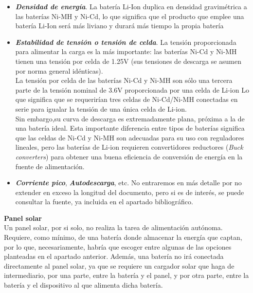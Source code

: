 \documentclass[12pt]{article}
\begin{document}
	\begin{itemize}
		\item \textit{\textbf{Densidad de energía}}. La batería Li-Ion duplica en densidad gravimétrica a las baterías Ni-MH y Ni-Cd, lo que significa que el producto que emplee una batería Li-Ion será más liviano y durará más tiempo la propia batería
		
		\item \textit{\textbf{Estabilidad de tensión o tensión de celda}}. 	La tensión proporcionada para alimentar la carga es la más importante: las baterías Ni-Cd y Ni-MH tienen una tensión por celda de 1.25V (sus tensiones de descarga se asumen por norma general idénticas). \\
		La tensión por celda de las baterías Ni-Cd y Ni-MH son sólo una tercera parte de la tensión nominal de 3.6V proporcionada por una celda de Li-ion Lo que significa que se requerirían tres celdas de Ni-Cd/Ni-MH conectadas en serie para igualar la tensión de una única celda de Li-ion.\\
		Sin embargo,su curva de descarga es extremadamente plana, próxima a la de una batería ideal. Esta importante diferencia entre tipos de baterías significa que las celdas de Ni-Cd y Ni-MH son adecuadas para su uso con reguladores lineales, pero las baterías de Li-ion requieren convertidores reductores (\textit{Buck converters}) para obtener una buena eficiencia de conversión de energía en la fuente de alimentación. 
		
		\item \textit{\textbf{Corriente pico}}, \textit{\textbf{Autodescarga}}, etc. No entraremos en más detalle por no extender en exceso la longitud del documento, pero si es de interés, se puede consultar la fuente, ya incluida en el apartado bibliográfico.
	\end{itemize}
	
	
	\noindent \textbf{Panel solar}\\ 
	
	\noindent Un panel solar, por si solo, no realiza la tarea de alimentación autónoma. Requiere, como mínimo, de una batería donde almacenar la energía que captan, por lo que, necesariamente, habría que escoger entre algunas de las opciones planteadas en el apartado anterior. Además, una batería no irá conectada directamente al panel solar, ya que se requiere un cargador solar que haga de intermediario, por una parte, entre la batería y el panel, y por otra parte, entre la batería y el dispositivo al que alimenta dicha batería. \\
	
\end{document}
